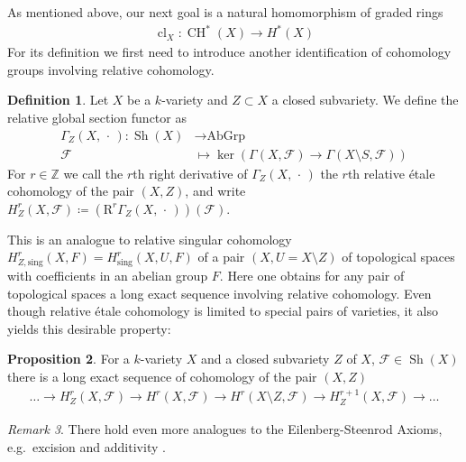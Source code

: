 \documentclass[english,headsepline=0.25pt]{scrartcl}
\theoremstyle{definition}
\newtheorem{Def}{Definition}[section]
\newtheorem{Prop}[Def]{Proposition}
\theoremstyle{remark}
\newtheorem{Rem}[Def]{Remark}
\newcommand*{\Z}{\mathds{Z}}
\newcommand*{\F}{\mathcal{F}} %
\DeclareMathOperator{\Sh}{Sh} %
\newcommand*{\forexample}{e.g.\ }
\newcommand*{\argreplacement}{\,\cdot\,} %
\DeclareMathOperator{\CH}{CH} %
\DeclareMathOperator{\CL}{cl} %
\begin{document}
As mentioned above, our next goal is a natural homomorphism of graded rings
\begin{gather*}
  \CL_X\colon \CH^*(X)\rightarrow H^*(X)
\end{gather*}
For its definition we first need to introduce another identification
of cohomology groups involving relative cohomology.

\begin{Def}\label{def:relcoh}
  Let $X$ be a $k$-variety and $Z\subset X$ a closed subvariety.
  We define the relative global section functor as
  \begin{align*}
    \Gamma_Z(X,\argreplacement) \colon \Sh(X) &\longrightarrow \text{AbGrp}\\
    \F &\longmapsto \ker\left(\Gamma(X,\F)\to \Gamma(X\setminus S,\F)\right)
  \end{align*}
  For $r\in\Z$ we call the $r$th right derivative of
  $\Gamma_Z(X,\argreplacement)$ the $r$th relative étale cohomology of the pair
  $(X,Z)$, and write
  $H_Z^r(X,\F)\coloneqq\left(\mathrm R^r\Gamma_Z(X,\argreplacement)\right)(\F)$.
\end{Def}
This is an analogue to relative singular cohomology
$H_{Z,\text{sing}}^r(X,F)=H_{\text{sing}}^r(X,U,F)$
of a pair $(X,U=X\setminus Z)$ of topological spaces with coefficients
in an abelian group $F$. Here one obtains for any pair of topological
spaces a long exact sequence involving relative cohomology.
Even though relative étale cohomology is limited to special pairs of
varieties, it also yields this desirable property:
\begin{Prop}\label{lesrelcoh}
  For a $k$-variety $X$ and a closed subvariety $Z$ of $X$,
  $\F\in\Sh(X)$ there is a long exact sequence of cohomology of the
  pair $(X,Z)$
  \begin{gather*}
    \dotsc
    \to H_Z^r(X,\F)
    \to H^r(X,\F)
    \to H^r(X\setminus Z,\F)
    \to H_Z^{r+1}(X,\F)
    \to \dotsc
  \end{gather*}
\end{Prop}
\begin{Rem}
  There hold even more analogues to the Eilenberg-Steenrod Axioms,
  \forexample excision and additivity \cite[][Chap.~9]{milne}.
\end{Rem}
\end{document}

